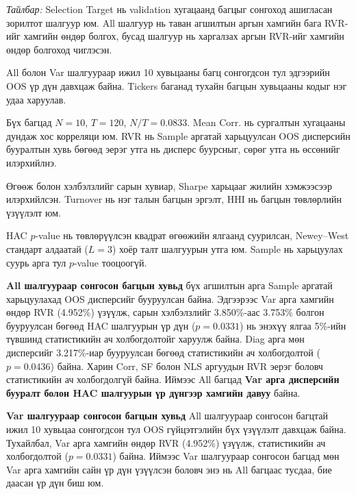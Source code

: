 \begin{table}
	\vspace{3mm}
	\begin{minipage}{0.96\textheight}
		\footnotesize
		\textit{Тайлбар:}
		Selection Target нь validation хугацаанд багцыг сонгоход
		ашигласан зорилтот шалгуур юм. All шалгуур нь таван
		агшилтын аргын хамгийн бага RVR-ийг хамгийн өндөр
		болгох, бусад шалгуур нь харгалзах аргын RVR-ийг
		хамгийн өндөр болгоход чиглэсэн.
		
		All болон Var шалгуураар ижил 10 хувьцааны багц
		сонгогдсон тул эдгээрийн OOS үр дүн давхцаж байна.
		Tickers баганад тухайн багцын хувьцааны кодыг
		нэг удаа харуулав.
		
		Бүх багцад $N=10$, $T=120$, $N/T=0.0833$.
		Mean Corr. нь сургалтын хугацааны дундаж хос
		корреляци юм. RVR нь Sample аргатай харьцуулсан
		OOS дисперсийн бууралтын хувь бөгөөд эерэг утга
		нь дисперс буурсныг, сөрөг утга нь өссөнийг илэрхийлнэ.
		
		Өгөөж болон хэлбэлзлийг сарын хувиар,
		Sharpe харьцааг жилийн хэмжээсээр илэрхийлсэн.
		Turnover нь нэг талын багцын эргэлт,
		HHI нь багцын төвлөрлийн үзүүлэлт юм.
		
		HAC $p$-value нь төвлөрүүлсэн квадрат өгөөжийн
		ялгаанд суурилсан, Newey--West стандарт алдаатай
		($L=3$) хоёр талт шалгуурын утга юм.
		Sample нь харьцуулах суурь арга тул
		$p$-value тооцоогүй.
	\end{minipage}
	
\end{table}

\noindent
\textbf{All шалгуураар сонгосон багцын хувьд}
бүх агшилтын арга Sample аргатай харьцуулахад OOS дисперсийг
бууруулсан байна. Эдгээрээс Var арга хамгийн өндөр RVR
(4.952\%) үзүүлж, сарын хэлбэлзлийг 3.850\%-аас 3.753\%
болгон бууруулсан бөгөөд HAC шалгуурын үр дүн
(\(p=0.0331\)) нь энэхүү ялгаа 5\%-ийн түвшинд
статистикийн ач холбогдолтойг харуулж байна.
Diag арга мөн дисперсийг 3.217\%-иар бууруулсан бөгөөд
статистикийн ач холбогдолтой (\(p=0.0436\)) байна.
Харин Corr, SF болон NLS аргуудын RVR эерэг боловч
статистикийн ач холбогдолгүй байна.
Иймээс All багцад \textbf{Var арга дисперсийн бууралт
	болон HAC шалгуурын үр дүнгээр хамгийн давуу} байна.

\par\medskip
\noindent
\textbf{Var шалгуураар сонгосон багцын хувьд}
All шалгуураар сонгосон багцтай ижил 10 хувьцаа
сонгогдсон тул OOS гүйцэтгэлийн бүх үзүүлэлт
давхцаж байна. Тухайлбал, Var арга хамгийн өндөр
RVR (4.952\%) үзүүлж, статистикийн ач холбогдолтой
(\(p=0.0331\)) байна. Иймээс Var шалгуураар сонгосон
багцад мөн Var арга хамгийн сайн үр дүн үзүүлсэн
боловч энэ нь All багцаас тусдаа, бие даасан
үр дүн биш юм.

